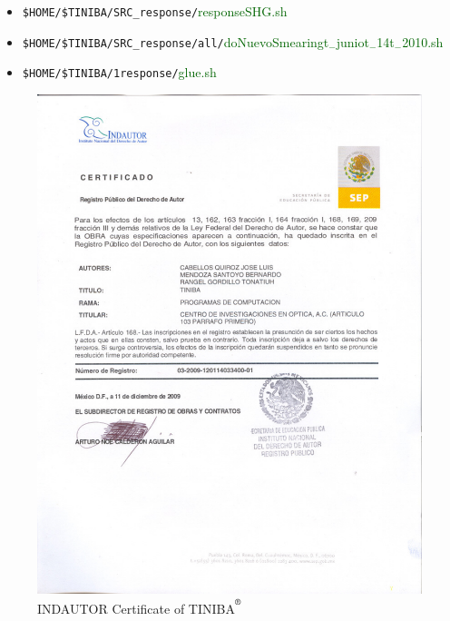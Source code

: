 \documentclass[12pt]{article}
\numberwithin{equation}{section}
\begin{document}
\begin{enumerate}
   
\begin{itemize}
\item \verb=$HOME/$TINIBA/SRC_response/=\textcolor{darkgreen}{responseSHG.sh} 
\item \verb=$HOME/$TINIBA/SRC_response/all/=\textcolor{darkgreen}{doNuevoSmearingt$_{-}$juniot$_{-}$14t$_{-}$2010.sh} 
\item \verb=$HOME/$TINIBA/1response/=\textcolor{darkgreen}{glue.sh} 
\end{itemize}

\end{enumerate}

\begin{figure}[t]
\begin{center}
\includegraphics[scale=0.6]{CERTIFICADO-INDAUTOR-TINIBA1}
\end{center}
\caption{INDAUTOR Certificate of TINIBA$^{\reg}$ 
}
\label{inpi}
\end{figure}
\end{document}
